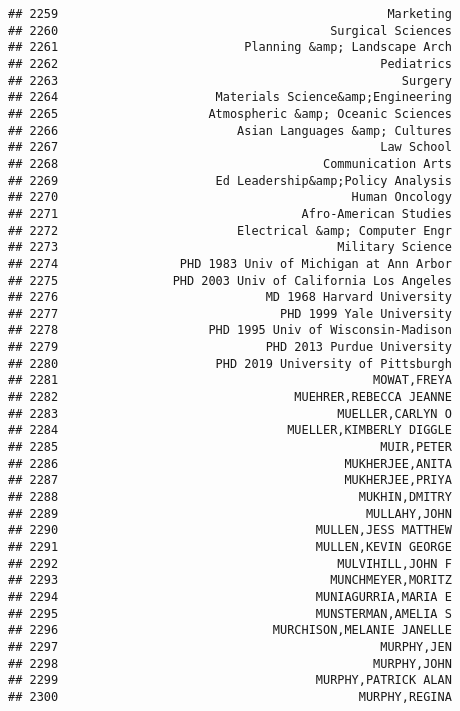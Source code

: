\documentclass[
]{article}
\begin{document}
\begin{verbatim}
## 2259                                              Marketing
## 2260                                      Surgical Sciences
## 2261                          Planning &amp; Landscape Arch
## 2262                                             Pediatrics
## 2263                                                Surgery
## 2264                      Materials Science&amp;Engineering
## 2265                     Atmospheric &amp; Oceanic Sciences
## 2266                         Asian Languages &amp; Cultures
## 2267                                             Law School
## 2268                                     Communication Arts
## 2269                      Ed Leadership&amp;Policy Analysis
## 2270                                         Human Oncology
## 2271                                  Afro-American Studies
## 2272                         Electrical &amp; Computer Engr
## 2273                                       Military Science
## 2274                 PHD 1983 Univ of Michigan at Ann Arbor
## 2275                PHD 2003 Univ of California Los Angeles
## 2276                             MD 1968 Harvard University
## 2277                               PHD 1999 Yale University
## 2278                     PHD 1995 Univ of Wisconsin-Madison
## 2279                             PHD 2013 Purdue University
## 2280                      PHD 2019 University of Pittsburgh
## 2281                                            MOWAT,FREYA
## 2282                                 MUEHRER,REBECCA JEANNE
## 2283                                       MUELLER,CARLYN O
## 2284                                MUELLER,KIMBERLY DIGGLE
## 2285                                             MUIR,PETER
## 2286                                        MUKHERJEE,ANITA
## 2287                                        MUKHERJEE,PRIYA
## 2288                                          MUKHIN,DMITRY
## 2289                                           MULLAHY,JOHN
## 2290                                    MULLEN,JESS MATTHEW
## 2291                                    MULLEN,KEVIN GEORGE
## 2292                                       MULVIHILL,JOHN F
## 2293                                      MUNCHMEYER,MORITZ
## 2294                                    MUNIAGURRIA,MARIA E
## 2295                                    MUNSTERMAN,AMELIA S
## 2296                              MURCHISON,MELANIE JANELLE
## 2297                                             MURPHY,JEN
## 2298                                            MURPHY,JOHN
## 2299                                    MURPHY,PATRICK ALAN
## 2300                                          MURPHY,REGINA

\end{verbatim}
\end{document}
